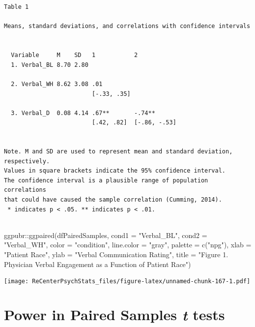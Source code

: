 \documentclass[
  11pt,
]{book}
\newenvironment{Shaded}{\begin{snugshade}}{\end{snugshade}}
\newcommand{\AttributeTok}[1]{\textcolor[rgb]{0.77,0.63,0.00}{#1}}
\newcommand{\FunctionTok}[1]{\textcolor[rgb]{0.00,0.00,0.00}{#1}}
\newcommand{\NormalTok}[1]{#1}
\newcommand{\SpecialCharTok}[1]{\textcolor[rgb]{0.00,0.00,0.00}{#1}}
\newcommand{\StringTok}[1]{\textcolor[rgb]{0.31,0.60,0.02}{#1}}
\begin{document}
\begin{verbatim}


Table 1 

Means, standard deviations, and correlations with confidence intervals
 

  Variable     M    SD   1           2           
  1. Verbal_BL 8.70 2.80                         
                                                 
  2. Verbal_WH 8.62 3.08 .01                     
                         [-.33, .35]             
                                                 
  3. Verbal_D  0.08 4.14 .67**       -.74**      
                         [.42, .82]  [-.86, -.53]
                                                 

Note. M and SD are used to represent mean and standard deviation, respectively.
Values in square brackets indicate the 95% confidence interval.
The confidence interval is a plausible range of population correlations 
that could have caused the sample correlation (Cumming, 2014).
 * indicates p < .05. ** indicates p < .01.
 
\end{verbatim}

\begin{Shaded}
\begin{Highlighting}[]
\NormalTok{ggpubr}\SpecialCharTok{::}\FunctionTok{ggpaired}\NormalTok{(dfPairedSamples, }\AttributeTok{cond1 =} \StringTok{"Verbal\_BL"}\NormalTok{, }\AttributeTok{cond2 =} \StringTok{"Verbal\_WH"}\NormalTok{,}
    \AttributeTok{color =} \StringTok{"condition"}\NormalTok{, }\AttributeTok{line.color =} \StringTok{"gray"}\NormalTok{, }\AttributeTok{palette =} \FunctionTok{c}\NormalTok{(}\StringTok{"npg"}\NormalTok{), }\AttributeTok{xlab =} \StringTok{"Patient Race"}\NormalTok{,}
    \AttributeTok{ylab =} \StringTok{"Verbal Communication Rating"}\NormalTok{, }\AttributeTok{title =} \StringTok{"Figure 1. Physician Verbal Engagement as a Function of Patient Race"}\NormalTok{)}
\end{Highlighting}
\end{Shaded}

\texttt{[image: ReCenterPsychStats\_files/figure-latex/unnamed-chunk-167-1.pdf]}

\hypertarget{power-in-paired-samples-t-tests}{%
\section{\texorpdfstring{Power in Paired Samples \emph{t} tests}{Power in Paired Samples t tests}}\label{power-in-paired-samples-t-tests}}
\end{document}
